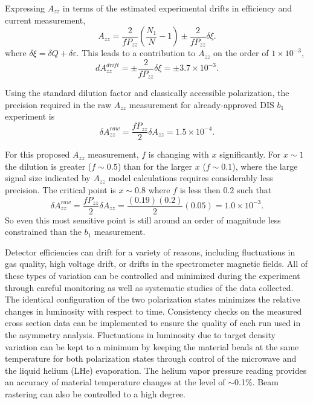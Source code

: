 Expressing $A_{zz}$ in terms of the estimated experimental drifts in efficiency and current measurement,
\begin{equation}
A_{zz}=\frac{2}{fP_{zz}}\left(\frac{N_1}{N}-1\right)\pm\frac{2}{fP_{zz}}\delta\xi.
\end{equation}
where $\delta\xi=\delta{Q}+\delta\varepsilon$. This leads to a contribution to $A_{zz}$ on the order of $1\times10^{-3}$,
\begin{equation}
dA_{zz}^{drift}=\pm\frac{2}{fP_{zz}}\delta\xi=\pm3.7\times10^{-3}.
\end{equation}

Using the standard dilution factor and classically accessible polarization, the precision required in the raw $A_{zz}$ measurement for already-approved DIS $b_1$ experiment is
\begin{equation}
\delta A_{zz}^{raw}=\frac{fP_{zz}}{2}\delta A_{zz} =1.5\times10^{-4}.
\end{equation}

For this proposed $A_{zz}$ measurement, $f$ is changing with $x$ significantly.  For $x\sim1$ the dilution is
greater ($f\sim0.5$) than for the larger $x$ ($f\sim0.1$), where the large signal size indicated by $A_{zz}$ model calculations requires considerably less precision.
The critical point is $x\sim0.8$ where $f$ is less then $0.2$ such that 
\begin{equation}
\delta A_{zz}^{raw}=\frac{fP_{zz}}{2}\delta A_{zz} =\frac{(0.19)(0.2)}{2}(0.05)=1.0\times10^{-3}.
\end{equation}  
So even this most sensitive point is still around an order of magnitude less constrained than the $b_1$ measurement.

Detector efficiencies can drift for a variety of reasons,
including fluctuations in gas quality, high voltage drift, or
drifts in the spectrometer magnetic fields.  All of these types of variation 
can be controlled and minimized during the experiment through careful monitoring as well as systematic studies of the data collected.  
The identical configuration of the two
polarization states minimizes the relative changes in luminosity with respect to time.  
Consistency checks on the measured cross section data can be implemented to 
ensure the quality of each run used in the asymmetry analysis.
Fluctuations in luminosity due to target density variation can be kept to a
minimum by keeping the material beads at the same temperature for both polarization
states through control of the microwave and the liquid helium (LHe) evaporation.  The helium vapor pressure reading
provides an accuracy of material temperature changes at the level of $\sim$0.1\%.
Beam rastering can also be controlled to a high degree.


